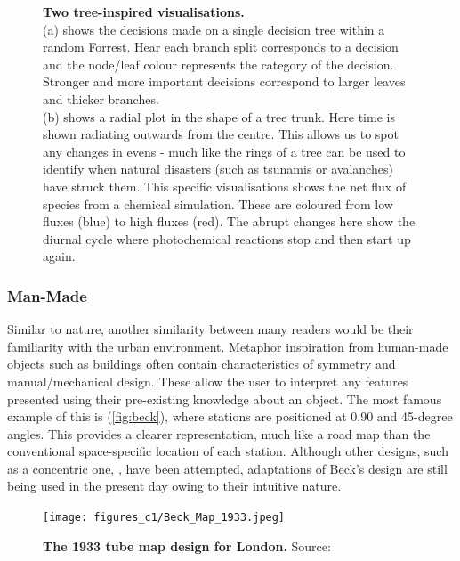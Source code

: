 \begin{figure}[H]
        \caption{\textbf{Two tree-inspired visualisations. }\\
         (a) shows the decisions made on a single decision tree within a random Forrest. Hear each branch split corresponds to a decision and the node/leaf colour represents the category of the decision. Stronger and more important decisions correspond to larger leaves and thicker branches. \\
          (b) shows a radial plot in the shape of a tree trunk. Here time is shown radiating outwards from the centre. This allows us to spot any changes in evens - much like the rings of a tree can be used to identify when natural disasters (such as tsunamis or avalanches) have struck them. This specific visualisations shows the net flux of species from a chemical simulation.
These are coloured from low fluxes (blue) to high fluxes (red). The abrupt changes here show the diurnal cycle where photochemical reactions stop and then start up again. }
        \label{fig:trees}
\end{figure}


\subsubsection{Man-Made}\label{sec:metman}
Similar to nature, another similarity between many readers would be their familiarity with the urban environment. Metaphor inspiration from human-made objects such as buildings often contain characteristics of symmetry and manual/mechanical design. These allow the user to interpret any features presented using their pre-existing knowledge about an object. The most famous example of this is (\autoref{fig:beck}), where stations are positioned at 0,90 and 45-degree angles. This provides a clearer representation, much like a road map than the conventional space-specific location of each station. Although other designs, such as a concentric one, \citep{circ}, have been attempted, adaptations of Beck's design are still being used in the present day owing to their intuitive nature.


\begin{figure}[H]
     \centering
         \texttt{[image: figures\_c1/Beck\_Map\_1933.jpeg]}
         \vspace{5mm}

         \caption{\textbf{The 1933 tube map design for London.} Source: \citep{beck}}

         \label{fig:beck}

\end{figure}


